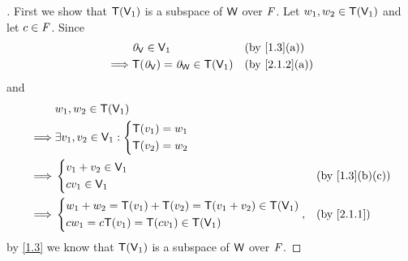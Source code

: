 \begin{proof}[]
  First we show that \(\mathsf{T}(\mathsf{V}_1)\) is a subspace of \(\mathsf{W}\) over \(\mathit{F}\).
  Let \(w_1, w_2 \in \mathsf{T}(\mathsf{V}_1)\) and let \(c \in \mathit{F}\).
  Since
  \begin{align*}
             & \zv_{\V} \in \V_1                    &  & \by{1.3}[a]   \\
    \implies & \T(\zv_{\V}) = \zv_{\W} \in \T(\V_1) &  & \by{2.1.2}[a]
  \end{align*}
  and
  \begin{align*}
             & w_1, w_2 \in \T(\V_1)                                                   \\
    \implies & \exists v_1, v_2 \in \V_1 : \begin{dcases}
                                             \T(v_1) = w_1 \\
                                             \T(v_2) = w_2
                                           \end{dcases}                               \\
    \implies & \begin{dcases}
                 v_1 + v_2 \in \V_1 \\
                 c v_1 \in \V_1
               \end{dcases}                                         &  & \by{1.3}[b,c] \\
    \implies & \begin{dcases}
                 w_1 + w_2 = \T(v_1) + \T(v_2) = \T(v_1 + v_2) \in \T(\V_1) \\
                 c w_1 = c \T(v_1) = \T(c v_1) \in \T(\V_1)
               \end{dcases}, &  & \by{2.1.1}
  \end{align*}
  by \cref{1.3} we know that \(\mathsf{T}(\mathsf{V}_1)\) is a subspace of \(\mathsf{W}\) over \(\mathit{F}\).


\end{proof}
